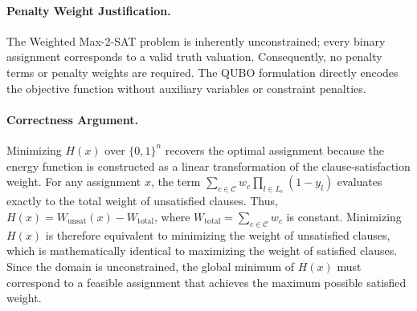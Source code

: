 \documentclass[12pt]{article}
\begin{document}
\paragraph{Penalty Weight Justification.}
The Weighted Max-2-SAT problem is inherently unconstrained; every binary assignment corresponds to a valid truth valuation. Consequently, no penalty terms or penalty weights are required. The QUBO formulation directly encodes the objective function without auxiliary variables or constraint penalties.

\paragraph{Correctness Argument.}
Minimizing $H(x)$ over $\{0,1\}^n$ recovers the optimal assignment because the energy function is constructed as a linear transformation of the clause-satisfaction weight. For any assignment $x$, the term $\sum_{c \in \mathcal{C}} w_c \prod_{l \in L_c} (1-y_l)$ evaluates exactly to the total weight of unsatisfied clauses. Thus, $H(x) = W_{\text{unsat}}(x) - W_{\text{total}}$, where $W_{\text{total}} = \sum_{c \in \mathcal{C}} w_c$ is constant. Minimizing $H(x)$ is therefore equivalent to minimizing the weight of unsatisfied clauses, which is mathematically identical to maximizing the weight of satisfied clauses. Since the domain is unconstrained, the global minimum of $H(x)$ must correspond to a feasible assignment that achieves the maximum possible satisfied weight.
\end{document}
